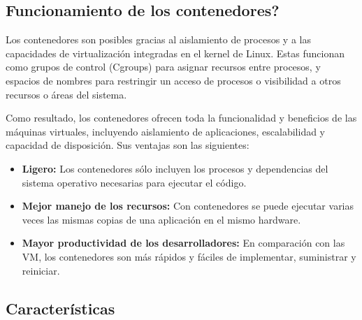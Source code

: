 		\subsection{Funcionamiento de los contenedores?}
			Los contenedores son posibles gracias al aislamiento de procesos y a las capacidades de virtualización integradas en el kernel de Linux. Estas funcionan como grupos de control (Cgroups) para asignar recursos entre procesos, y espacios de nombres para restringir un acceso de procesos o visibilidad a otros recursos o áreas del sistema.\par	
			
			Como resultado, los contenedores ofrecen toda la funcionalidad y beneficios de las máquinas virtuales, incluyendo aislamiento de aplicaciones, escalabilidad y capacidad de disposición. Sus ventajas son las siguientes:\par
			
			\begin{itemize}
				\item \textbf{Ligero:} Los contenedores sólo incluyen los procesos y dependencias del sistema operativo necesarias para ejecutar el código.
				
				\item \textbf{Mejor manejo de los recursos:} Con contenedores se puede ejecutar varias veces las mismas copias de una aplicación en el mismo hardware.
				
				\item \textbf{Mayor productividad de los desarrolladores:} En comparación con las VM, los contenedores son más rápidos y fáciles de implementar, suministrar y reiniciar.
			
			\end{itemize}
			
		\subsection{Características}
		
			\vspace{0.3cm}
				
